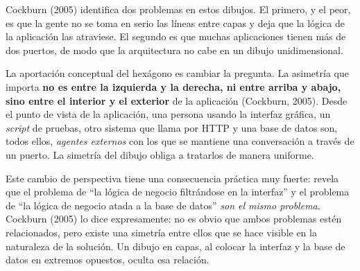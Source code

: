 \documentclass[11pt,a4paper]{article}
\begin{document}
Cockburn (2005) identifica dos problemas en estos dibujos. El primero, y el peor, es que la gente no se toma en serio las líneas entre capas y deja que la lógica de la aplicación las atraviese. El segundo es que muchas aplicaciones tienen más de dos puertos, de modo que la arquitectura no cabe en un dibujo unidimensional.

La aportación conceptual del hexágono es cambiar la pregunta. La asimetría que importa \textbf{no es entre la izquierda y la derecha, ni entre arriba y abajo, sino entre el interior y el exterior} de la aplicación (Cockburn, 2005). Desde el punto de vista de la aplicación, una persona usando la interfaz gráfica, un \emph{script} de pruebas, otro sistema que llama por HTTP y una base de datos son, todos ellos, \emph{agentes externos} con los que se mantiene una conversación a través de un puerto. La simetría del dibujo obliga a tratarlos de manera uniforme.

Este cambio de perspectiva tiene una consecuencia práctica muy fuerte: revela que el problema de ``la lógica de negocio filtrándose en la interfaz'' y el problema de ``la lógica de negocio atada a la base de datos'' \emph{son el mismo problema}. Cockburn (2005) lo dice expresamente: no es obvio que ambos problemas estén relacionados, pero existe una simetría entre ellos que se hace visible en la naturaleza de la solución. Un dibujo en capas, al colocar la interfaz y la base de datos en extremos opuestos, oculta esa relación.
\end{document}
